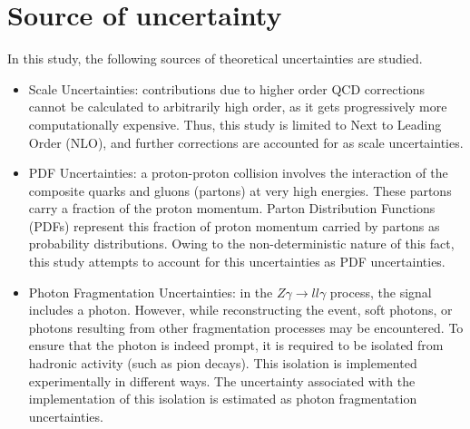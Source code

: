 \documentclass[11pt,a4paper,openright,twoside]{report}
\newcommand{\Zg}{$Z\gamma\to ll\gamma$ }
\begin{document}
\section{Source of uncertainty}
In this study, the following sources of theoretical uncertainties are studied.
\begin{itemize}
\item Scale Uncertainties: contributions due to higher order QCD corrections cannot be calculated to arbitrarily high order, as it gets progressively more computationally expensive. Thus, this study is limited to Next to Leading Order (NLO), and further corrections are accounted for as scale uncertainties.
\item PDF Uncertainties: a proton-proton collision involves the interaction of the composite quarks and gluons (partons) at very high energies. These partons carry a fraction of the proton momentum. Parton Distribution Functions (PDFs) represent this fraction of proton momentum carried by partons as probability distributions. Owing to the non-deterministic nature of this fact, this study attempts to account for this uncertainties as PDF uncertainties.
\item Photon Fragmentation Uncertainties: in the \Zg process, the signal includes a photon. However, while reconstructing the event, soft photons, or photons resulting from other fragmentation processes may be encountered. To ensure that the photon is indeed prompt, it is required to be isolated from hadronic activity (such as pion decays). This isolation is implemented experimentally in different ways. The uncertainty associated with the implementation of this isolation is estimated as photon fragmentation uncertainties.
\end{itemize}
\end{document}
